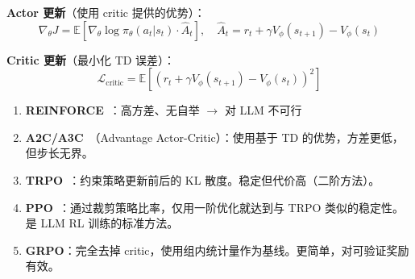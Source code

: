 \textbf{Actor 更新}（使用 critic 提供的优势）：
\begin{equation}
\nabla_\theta J = \mathbb{E}\left[\nabla_\theta \log \pi_\theta(a_t|s_t) \cdot \hat{A}_t\right], \quad \hat{A}_t = r_t + \gamma V_\phi(s_{t+1}) - V_\phi(s_t)
\end{equation}

\textbf{Critic 更新}（最小化 TD 误差）：
\begin{equation}
\mathcal{L}_\text{critic} = \mathbb{E}\left[(r_t + \gamma V_\phi(s_{t+1}) - V_\phi(s_t))^2\right]
\end{equation}

\begin{keybox}
\begin{enumerate}
  \item \textbf{REINFORCE}~\cite{williams1992simple}：高方差、无自举 $\rightarrow$ 对 LLM 不可行
  \item \textbf{A2C/A3C}~\cite{mnih2016asynchronous}（Advantage Actor-Critic）：使用基于 TD 的优势，方差更低，但步长无界。
  \item \textbf{TRPO}~\cite{schulman2015trust}：约束策略更新前后的 KL 散度。稳定但代价高（二阶方法）。
  \item \textbf{PPO}~\cite{schulman2017proximal}：通过裁剪策略比率，仅用一阶优化就达到与 TRPO 类似的稳定性。是 LLM RL 训练的标准方法。
  \item \textbf{GRPO}：完全去掉 critic，使用组内统计量作为基线。更简单，对可验证奖励有效。
\end{enumerate}
\end{keybox}

